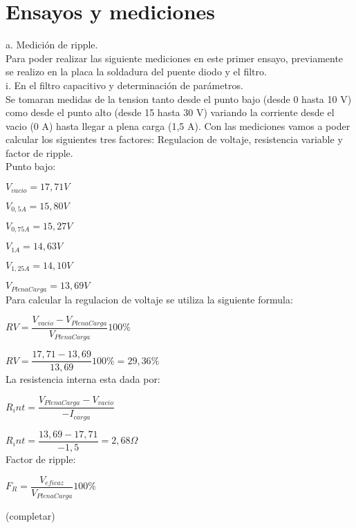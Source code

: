 \chapter{Ensayos y mediciones}

a. Medición de ripple.\\

  Para poder realizar las siguiente mediciones en este primer ensayo, previamente se realizo en la placa la soldadura del puente diodo y el filtro.\\

i. En el filtro capacitivo y determinación de parámetros.\\

  Se tomaran medidas de la tension tanto desde el punto bajo (desde 0 hasta 10 V) como desde el punto alto (desde 15 hasta 30 V) variando la corriente desde el vacio (0 A) hasta llegar a plena carga (1,5 A). Con las mediciones vamos a poder calcular los siguientes tres factores: Regulacion de voltaje, resistencia variable y factor de ripple.\\

Punto bajo:

  $V_{vacio} = 17,71 V$

  $V_{0,5A} = 15,80 V$
  
  $V_{0,75A} = 15,27 V$ 
  
  $V_{1A} = 14,63 V$
  
  $V_{1,25A} = 14,10V$
  
  $V_{PlenaCarga} = 13,69 V$\\

Para calcular la regulacion de voltaje se utiliza la siguiente formula:

$RV = \dfrac{V_{vacio} - V_{PlenaCarga}}{V_{PlenaCarga}} 100\percent $

$RV = \dfrac{17,71 - 13,69}{13,69} 100\percent = 29,36\percent $\\

La resistencia interna esta dada por:

$R_int = \dfrac{V_{PlenaCarga} - V_{vacio}}{-I_{carga}}$

$R_int = \dfrac{13,69 - 17,71}{-1,5} = 2,68\Omega $\\

Factor de ripple:

$F_R = \dfrac{V_{eficaz}}{V_{PlenaCarga}} 100\percent $

(completar)\\

